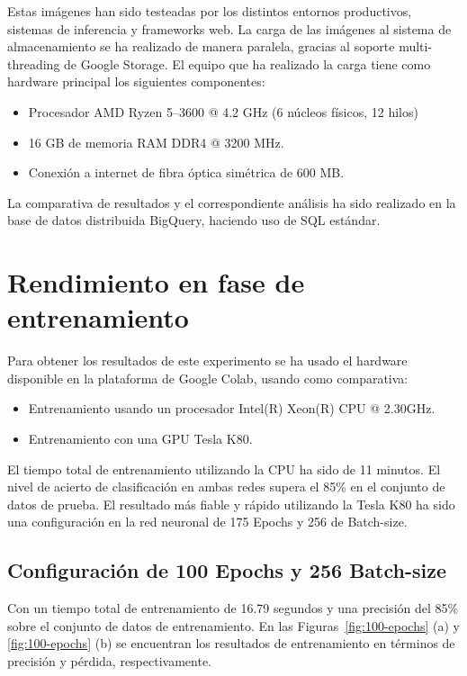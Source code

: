 Estas imágenes han sido testeadas por los distintos entornos productivos, sistemas de inferencia y frameworks web.
La carga de las imágenes al sistema de almacenamiento se ha realizado de manera paralela, gracias al soporte multi-threading de Google Storage.
El equipo que ha realizado la carga tiene como hardware principal los siguientes componentes:
\begin{itemize}
    \item Procesador AMD Ryzen 5--3600 @ 4.2 GHz (6 núcleos físicos, 12 hilos)
    \item 16 GB de memoria RAM DDR4 @ 3200 MHz.
    \item Conexión a internet de fibra óptica simétrica de 600 MB\@.
\end{itemize}

La comparativa de resultados y el correspondiente análisis ha sido realizado en la base de datos distribuida BigQuery, haciendo uso de SQL estándar.


\section{Rendimiento en fase de entrenamiento}\label{sec:rendimiento-en-fase-de-entrenamiento}
Para obtener los resultados de este experimento se ha usado el hardware disponible en la plataforma de Google Colab, usando como comparativa:
\begin{itemize}
    \item Entrenamiento usando un procesador Intel(R) Xeon(R) CPU @ 2.30GHz.
    \item Entrenamiento con una GPU Tesla K80.
\end{itemize}

El tiempo total de entrenamiento utilizando la CPU ha sido de 11 minutos.
El nivel de acierto de clasificación en ambas redes supera el 85\% en el conjunto de datos de prueba.
El resultado más fiable y rápido utilizando la Tesla K80 ha sido una configuración en la red neuronal de 175 Epochs y 256 de Batch-size.

\subsection{Configuración de 100 Epochs y 256 Batch-size}
  Con un tiempo total de entrenamiento de 16.79 segundos y una precisión del 85\% sobre el conjunto de datos de entrenamiento.
    En las Figuras~\ref{fig:100-epochs} (a) y \ref{fig:100-epochs} (b) se encuentran los resultados de entrenamiento en términos de precisión y pérdida, respectivamente.


